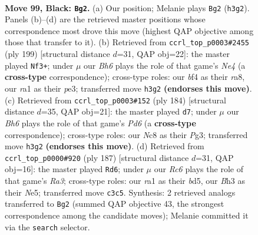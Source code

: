 \documentclass[11pt]{article}
\begin{document}
\clearpage

\begin{figure}[p]\centering
\begin{subfigure}{0.46\textwidth}\centering
\resizebox{\linewidth}{!}{%
\newchessgame
\chessboard[
  setfen={2n4K/8/p3k3/P4p1p/5B2/N1r3Pb/8/R7 b - - 9 99},
  showmover=false,
  pgfstyle=straightmove, color=movearrow, markmove={h3-g2}
]}
\caption{}
\end{subfigure}\hfill
\begin{subfigure}{0.46\textwidth}\centering
\resizebox{\linewidth}{!}{%
\newchessgame
\chessboard[
  setfen={R7/6k1/6p1/4n3/6Pp/4P2P/8/3r1BK1 b - - 4 100},
  showmover=false,
  pgfstyle=straightmove, color=movearrow, markmove={e5-f3}
]}
\caption{}
\end{subfigure}
\\[4pt]
\begin{subfigure}{0.46\textwidth}\centering
\resizebox{\linewidth}{!}{%
\newchessgame
\chessboard[
  setfen={2r5/6k1/1p1P3n/p3p3/P3P2R/6P1/4B3/7K w - - 0 93},
  showmover=false,
  pgfstyle=straightmove, color=movearrow, markmove={d6-d7}
]}
\caption{}
\end{subfigure}\hfill
\begin{subfigure}{0.46\textwidth}\centering
\resizebox{\linewidth}{!}{%
\newchessgame
\chessboard[
  setfen={8/7k/r3Npp1/3Bn2p/7P/6P1/2KB4/8 b - - 55 94},
  showmover=false,
  pgfstyle=straightmove, color=movearrow, markmove={a6-d6}
]}
\caption{}
\end{subfigure}
\caption{\textbf{Move 99, Black: \texttt{Bg2}.} (a) Our position; Melanie plays \texttt{Bg2} (\texttt{h3g2}). Panels (b)--(d) are the retrieved master positions whose correspondence most drove this move (highest QAP objective among those that transfer to it). (b) Retrieved from \texttt{ccrl\_top\_p0003\#2455} (ply 199) [structural distance $d$=31, QAP obj=22]: the master played \texttt{Nf3+}; under $\mu$ our \emph{Bh6} plays the role of that game's \emph{Ne4} (a \textbf{cross-type} correspondence); cross-type roles: our \emph{b}f4 as their \emph{r}a8, our \emph{r}a1 as their \emph{p}e3; transferred move \texttt{h3g2} \textbf{(endorses this move)}. (c) Retrieved from \texttt{ccrl\_top\_p0003\#152} (ply 184) [structural distance $d$=35, QAP obj=21]: the master played \texttt{d7}; under $\mu$ our \emph{Bh6} plays the role of that game's \emph{Pd6} (a \textbf{cross-type} correspondence); cross-type roles: our \emph{N}c8 as their \emph{P}g3; transferred move \texttt{h3g2} \textbf{(endorses this move)}. (d) Retrieved from \texttt{ccrl\_top\_p0000\#920} (ply 187) [structural distance $d$=31, QAP obj=16]: the master played \texttt{Rd6}; under $\mu$ our \emph{Rc6} plays the role of that game's \emph{Ra3}; cross-type roles: our \emph{r}a1 as their \emph{b}d5, our \emph{B}h3 as their \emph{N}e5; transferred move \texttt{c3c5}. Synthesis: 2 retrieved analogs transferred to \texttt{Bg2} (summed QAP objective 43, the strongest correspondence among the candidate moves); Melanie committed it via the \texttt{search} selector.}
\label{fig:thought-m197}
\end{figure}
\end{document}
